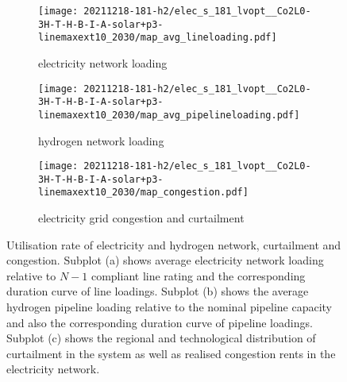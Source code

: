 \begin{figure}
    \centering
    \begin{subfigure}{0.49\textwidth}
        \centering
        \caption{electricity network loading}
        \texttt{[image: 20211218-181-h2/elec\_s\_181\_lvopt\_\_Co2L0-3H-T-H-B-I-A-solar+p3-linemaxext10\_2030/map\_avg\_lineloading.pdf]}
    \end{subfigure}
    \begin{subfigure}{0.49\textwidth}
        \centering
        \caption{hydrogen network loading}
        \texttt{[image: 20211218-181-h2/elec\_s\_181\_lvopt\_\_Co2L0-3H-T-H-B-I-A-solar+p3-linemaxext10\_2030/map\_avg\_pipelineloading.pdf]}
    \end{subfigure}
    \begin{subfigure}{0.70\textwidth}
        \vspace{1cm}
        \centering
        \caption{electricity grid congestion and curtailment}
        \texttt{[image: 20211218-181-h2/elec\_s\_181\_lvopt\_\_Co2L0-3H-T-H-B-I-A-solar+p3-linemaxext10\_2030/map\_congestion.pdf]}
    \end{subfigure}
    \caption{Utilisation rate of electricity and hydrogen network, curtailment and congestion. Subplot (a) shows average electricity network loading relative to $N-1$ compliant line rating and the corresponding duration curve of line loadings. Subplot (b) shows the average hydrogen pipeline loading relative to the nominal pipeline capacity and also the corresponding duration curve of pipeline loadings. Subplot (c) shows the regional and technological distribution of curtailment in the system as well as realised congestion rents in the electricity network.}
    \label{fig:si:grid-utilisation}
\end{figure}

